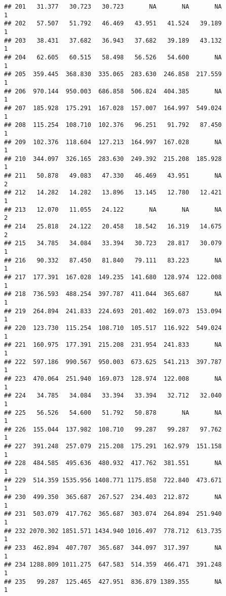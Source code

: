 \documentclass[
]{article}
\begin{document}
\begin{verbatim}
## 201   31.377   30.723   30.723       NA       NA       NA             1
## 202   57.507   51.792   46.469   43.951   41.524   39.189             1
## 203   38.431   37.682   36.943   37.682   39.189   43.132             1
## 204   62.605   60.515   58.498   56.526   54.600       NA             1
## 205  359.445  368.830  335.065  283.630  246.858  217.559             1
## 206  970.144  950.003  686.858  506.824  404.385       NA             1
## 207  185.928  175.291  167.028  157.007  164.997  549.024             1
## 208  115.254  108.710  102.376   96.251   91.792   87.450             1
## 209  102.376  118.604  127.213  164.997  167.028       NA             1
## 210  344.097  326.165  283.630  249.392  215.208  185.928             1
## 211   50.878   49.083   47.330   46.469   43.951       NA             2
## 212   14.282   14.282   13.896   13.145   12.780   12.421             1
## 213   12.070   11.055   24.122       NA       NA       NA             2
## 214   25.818   24.122   20.458   18.542   16.319   14.675             2
## 215   34.785   34.084   33.394   30.723   28.817   30.079             1
## 216   90.332   87.450   81.840   79.111   83.223       NA             1
## 217  177.391  167.028  149.235  141.680  128.974  122.008             1
## 218  736.593  488.254  397.787  411.044  365.687       NA             1
## 219  264.894  241.833  224.693  201.402  169.073  153.094             1
## 220  123.730  115.254  108.710  105.517  116.922  549.024             1
## 221  160.975  177.391  215.208  231.954  241.833       NA             1
## 222  597.186  990.567  950.003  673.625  541.213  397.787             1
## 223  470.064  251.940  169.073  128.974  122.008       NA             1
## 224   34.785   34.084   33.394   33.394   32.712   32.040             1
## 225   56.526   54.600   51.792   50.878       NA       NA             1
## 226  155.044  137.982  108.710   99.287   99.287   97.762             1
## 227  391.248  257.079  215.208  175.291  162.979  151.158             1
## 228  484.585  495.636  480.932  417.762  381.551       NA             1
## 229  514.359 1535.956 1408.771 1175.858  722.840  473.671             1
## 230  499.350  365.687  267.527  234.403  212.872       NA             1
## 231  503.079  417.762  365.687  303.074  264.894  251.940             1
## 232 2070.302 1851.571 1434.940 1016.497  778.712  613.735             1
## 233  462.894  407.707  365.687  344.097  317.397       NA             1
## 234 1288.809 1011.275  647.583  514.359  466.471  391.248             1
## 235   99.287  125.465  427.951  836.879 1389.355       NA             1

\end{verbatim}
\end{document}
